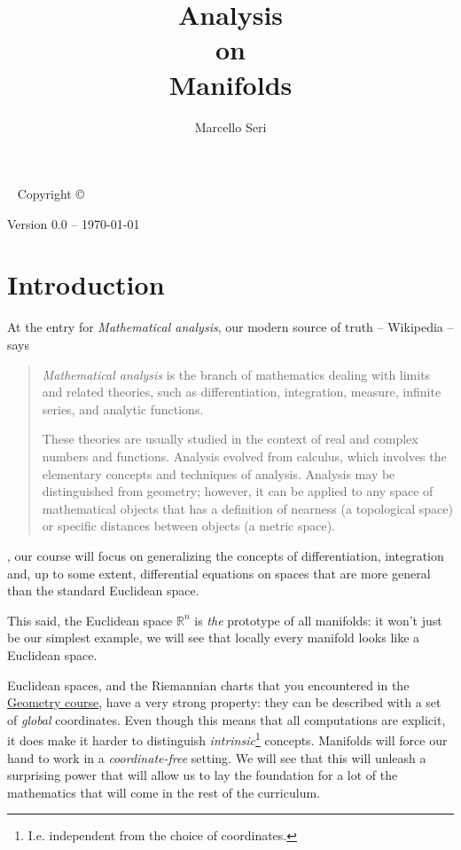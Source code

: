 \documentclass[nobib, a4paper]{tufte-book}
\title{Analysis\\ \noindent
on\\ \noindent
Manifolds
}
\author{Marcello Seri}
\theoremstyle{plain}
\theoremstyle{definition}
\theoremstyle{remark}
\newcommand{\R}{\mathbb{R}}
\begin{document}
\maketitlepage

\newpage

\begin{fullwidth}
    ~\vfill
    \thispagestyle{empty}
    \setlength{\parindent}{0pt}
    \setlength{\parskip}{\baselineskip}
    Copyright \copyright\ \the\year\ \thanklessauthor
    
    \par Version 0.0 -- \today

    \vfill
    \small{\doclicenseThis}
    
\end{fullwidth}
    
\tableofcontents
\cleardoublepage

\chapter*{Introduction}

At the entry for \emph{Mathematical analysis}, our modern source of truth -- Wikipedia -- says

\begin{quotation}
  \emph{Mathematical analysis} is the branch of mathematics dealing with limits and related theories, such as differentiation, integration, measure, infinite series, and analytic functions.

  These theories are usually studied in the context of real and complex numbers and functions. Analysis evolved from calculus, which involves the elementary concepts and techniques of analysis. Analysis may be distinguished from geometry; however, it can be applied to any space of mathematical objects that has a definition of nearness (a topological space) or specific distances between objects (a metric space). 
\end{quotation}

, our course will focus on generalizing the concepts of differentiation, integration and, up to some extent, differential equations on spaces that are more general than the standard Euclidean space.

This said, the Euclidean space $\R^n$ is \emph{the} prototype of all manifolds: it won't just be our simplest example, we will see that locally every manifold looks like a Euclidean space.

Euclidean spaces, and the Riemannian charts that you encountered in the \href{http://www.rolandvdv.nl/G20/}{Geometry course}, have a very strong property: they can be described with a set of \emph{global} coordinates.
Even though this means that all computations are explicit, it does make it harder to distinguish \emph{intrinsic}\footnote{I.e. independent from the choice of coordinates.} concepts.
Manifolds will force our hand to work in a \emph{coordinate-free} setting.
We will see that this will unleash a surprising power that will allow us to lay the foundation for a lot of the mathematics that will come in the rest of the curriculum.
\end{document}
